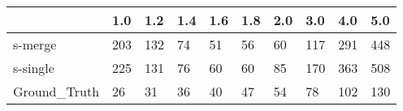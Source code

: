 \begin{tabular}{llllllllll}
\toprule
{} &  1.0 &  1.2 & 1.4 & 1.6 & 1.8 & 2.0 &  3.0 &  4.0 &  5.0 \\
\midrule
s-merge      &  203 &  132 &  74 &  51 &  56 &  60 &  117 &  291 &  448 \\
s-single     &  225 &  131 &  76 &  60 &  60 &  85 &  170 &  363 &  508 \\
Ground\_Truth &   26 &   31 &  36 &  40 &  47 &  54 &   78 &  102 &  130 \\
\bottomrule
\end{tabular}
